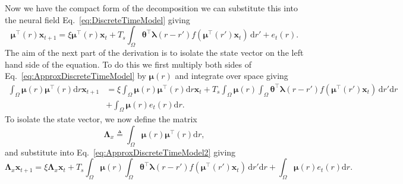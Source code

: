 \documentclass[review,authoryear,3p]{elsarticle}
\begin{document}
% 
Now we have the compact form of the decomposition we can substitute this into the neural field Eq.~\eqref{eq:DiscreteTimeModel} giving
\begin{equation}\label{eq:ApproxDiscreteTimeModel}
	\boldsymbol\mu^\top\left(r\right)\mathbf{x}_{t+1} = 
	\xi \boldsymbol\mu^\top\left(r\right)\mathbf{x}_t + 
	T_s \int_\Omega { 
	    \boldsymbol\theta^\top\boldsymbol\lambda\left(r-r'\right)
	    f\left(\boldsymbol\mu^\top\left(r'\right)\mathbf{x}_t\right) 
	\, \mathrm{d}r'}  
	+ e_t\left(r\right).
\end{equation}
The aim of the next part of the derivation is to isolate the state vector on the left hand side of the equation. To do this we first multiply both sides of Eq.~\eqref{eq:ApproxDiscreteTimeModel} by $\boldsymbol\mu\left(r\right)$ and integrate over space giving 
\begin{align}\label{eq:ApproxDiscreteTimeModel2}
	\int_{\Omega} \boldsymbol\mu\left(r\right)\boldsymbol\mu^\top\left(r\right) \mathrm{d}r \mathbf{x}_{t+1} &= 
	\xi \int_{\Omega}\boldsymbol\mu\left(r\right)\boldsymbol\mu^\top\left(r\right) \mathrm{d}r \mathbf{x}_t + 
	T_s \int_{\Omega}\boldsymbol\mu\left(r\right)\int_\Omega { 
	    \boldsymbol\theta^\top\boldsymbol\lambda\left(r-r'\right)
	    f\left(\boldsymbol\mu^\top\left(r'\right)\mathbf{x}_t\right) 
	\, \mathrm{d}r'\mathrm{d}r}  \nonumber\\
	&+ \int_{\Omega}\boldsymbol\mu\left(r\right)e_t\left(r\right)\mathrm{d}r.
\end{align}
To isolate the state vector, we now define the matrix 
\begin{equation}
	\label{eq:Lambdax}
	 \mathbf{\Lambda}_{x} \triangleq \int_{\Omega}\boldsymbol{\mu}\left(r\right)\boldsymbol{\mu}^\top\left(r\right) \mathrm{d}r,
\end{equation}
and substitute into Eq.~\eqref{eq:ApproxDiscreteTimeModel2} giving
\begin{equation}\label{eq:ApproxDiscreteTimeModel3}
	\mathbf{\Lambda}_{x} \mathbf{x}_{t+1} = 
	\xi \mathbf{\Lambda}_{x} \mathbf{x}_t + 
	T_s \int_{\Omega}\boldsymbol\mu\left(r\right)\int_\Omega { 
	    \boldsymbol\theta^\top\boldsymbol\lambda\left(r-r'\right)
	    f\left(\boldsymbol\mu^\top\left(r'\right)\mathbf{x}_t\right) 
	\, \mathrm{d}r'\mathrm{d}r}  
	+ \int_{\Omega}\boldsymbol{\mu}\left(r\right) e_t\left(r\right) \mathrm{d}r.
\end{equation}
\end{document}
